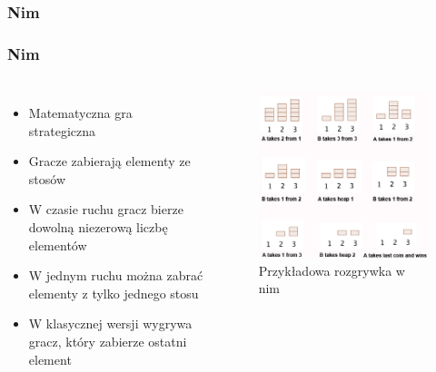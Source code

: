 \documentclass[polish,envcountsect,10pt]{beamer}
\begin{document}
            \subsubsection{Nim}
                \begin{frame}
                    \frametitle{Nim}
                    \begin{columns}
                        \begin{itemize}
                            \item<1-> Matematyczna gra strategiczna
                            \item<2-> Gracze zabierają elementy ze stosów
                            \item<3-> W czasie ruchu gracz bierze dowolną niezerową liczbę elementów
                            \item<4-> W jednym ruchu można zabrać elementy z tylko jednego stosu
                            \item<5-> W klasycznej wersji wygrywa gracz, który zabierze ostatni element
                        \end{itemize}
                        \begin{figure}[H]
                            \centering
                            \includegraphics[width=\textwidth]{images/nim_game}
                            \caption{Przykładowa rozgrywka w nim}
                        \end{figure}
                    \end{columns}
                \end{frame}
\end{document}
